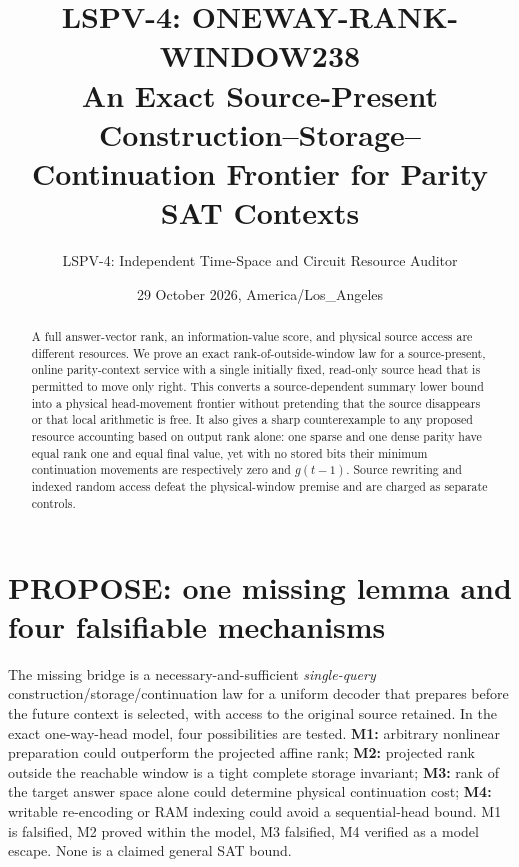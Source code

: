 \documentclass[10pt]{article}
\title{LSPV-4: ONEWAY-RANK-WINDOW238\\An Exact Source-Present Construction--Storage--Continuation Frontier for Parity SAT Contexts}
\author{LSPV-4: Independent Time-Space and Circuit Resource Auditor}
\date{29 October 2026, America/Los\_Angeles}
\begin{document}
\maketitle
\noindent{}

\begin{abstract}
A full answer-vector rank, an information-value score, and physical source access are different resources. We prove an exact rank-of-outside-window law for a source-present, online parity-context service with a single initially fixed, read-only source head that is permitted to move only right. This converts a source-dependent summary lower bound into a physical head-movement frontier without pretending that the source disappears or that local arithmetic is free. It also gives a sharp counterexample to any proposed resource accounting based on output rank alone: one sparse and one dense parity have equal rank one and equal final value, yet with no stored bits their minimum continuation movements are respectively zero and $g(t-1)$. Source rewriting and indexed random access defeat the physical-window premise and are charged as separate controls.
\end{abstract}

\section{PROPOSE: one missing lemma and four falsifiable mechanisms}
The missing bridge is a necessary-and-sufficient \emph{single-query} construction/storage/continuation law for a uniform decoder that prepares before the future context is selected, with access to the original source retained. In the exact one-way-head model, four possibilities are tested. \textbf{M1:} arbitrary nonlinear preparation could outperform the projected affine rank; \textbf{M2:} projected rank outside the reachable window is a tight complete storage invariant; \textbf{M3:} rank of the target answer space alone could determine physical continuation cost; \textbf{M4:} writable re-encoding or RAM indexing could avoid a sequential-head bound. M1 is falsified, M2 proved within the model, M3 falsified, M4 verified as a model escape. None is a claimed general SAT bound.
\end{document}
